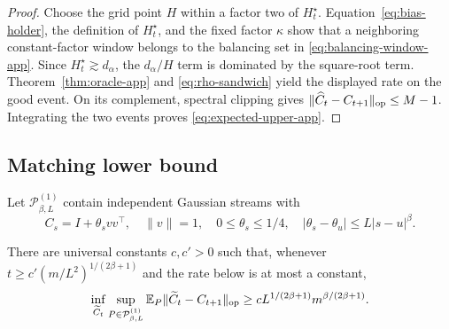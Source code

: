 \begin{proof}
Choose the grid point $H$ within a factor two of $H_t^\star$.  Equation~\eqref{eq:bias-holder}, the definition of $H_t^\star$, and the fixed factor $\kappa$ show that a neighboring constant-factor window belongs to the balancing set in \eqref{eq:balancing-window-app}.  Since $H_t^\star\gtrsim d_\alpha$, the $d_\alpha/H$ term is dominated by the square-root term.  Theorem~\ref{thm:oracle-app} and \eqref{eq:rho-sandwich} yield the displayed rate on the good event.  On its complement, spectral clipping gives $\|\widehat C_t-C_{t+1}\|_{\mathrm{op}}\le M-1$.  Integrating the two events proves \eqref{eq:expected-upper-app}.  \end{proof}

\subsection{Matching lower bound}

Let $\mathcal P_{\beta,L}^{(1)}$ contain independent Gaussian streams with
\begin{equation}
 C_s=I+\theta_svv^\top,\quad \|v\|=1,\quad 0\le\theta_s\le1/4,
 \quad |\theta_s-\theta_u|\le L|s-u|^\beta.
\end{equation}

\begin{theorem}
\label{thm:lower-app}
There are universal constants $c,c'>0$ such that, whenever
$t\ge c'(m/L^2)^{1/(2\beta+1)}$ and the rate below is at most a constant,
\begin{equation}
 \inf_{\widetilde C_t}\sup_{P\in\mathcal P_{\beta,L}^{(1)}}
 \mathbb E_P\|\widetilde C_t-C_{t+1}\|_{\mathrm{op}}
 \ge cL^{1/(2\beta+1)}m^{\beta/(2\beta+1)}.
 \label{eq:lower-app}
\end{equation}
\end{theorem}

